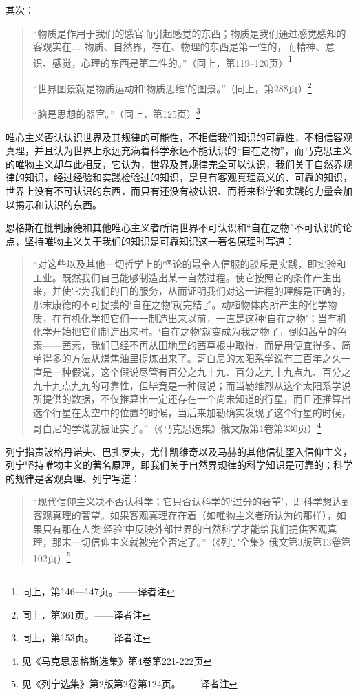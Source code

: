 其次：

\begin{quotation}
“物质是作用于我们的感官而引起感觉的东西；物质是我们通过感觉感知的客观实在……物质、自然界，存在、物理的东西是第一性的，而精神、意识、感觉，心理的东西是第二性的。”（同上，第119--120页）\footnote{同上，第146—147页。——译者注}

“世界图景就是物质运动和‘物质思维’的图景。”（同上，第288页）\footnote{同上，第361页。——译者注}

“脑是思想的器官。”（同上，第125页）\footnote{同上，第153页。——译者注}
\end{quotation}

唯心主义否认认识世界及其规律的可能性，不相信我们知识的可靠性，不相信客观真理，并且认为世界上永远充满着科学永远不能认识的“自在之物”，而马克思主义的唯物主义却与此相反，它认为，世界及其规律完全可以认识，我们关于自然界规律的知识，经过经验和实践检验过的知识，是具有客观真理意义的、可靠的知识，世界上没有不可认识的东西，而只有还没有被认识、而将来科学和实践的力量会加以揭示和认识的东西。

恩格斯在批判康德和其他唯心主义者所谓世界不可认识和“自在之物”不可认识的论点，坚持唯物主义关于我们的知识是可靠知识这一著名原理时写道：

\begin{quotation}
“对这些以及其他一切哲学上的怪论的最令人信服的驳斥是实践，即实验和工业。既然我们自己能够制造出某一自然过程。使它按照它的条件产生出来，并使它为我们的目的服务，从而证明我们对这一进程的理解是正确的，那末康德的不可捉摸的‘自在之物’就完结了。动植物体内所产生的化学物质，在有机化学把它们一一制造出来以前，一直是这种‘自在之物’；当有机化学开始把它们制造出来时。‘自在之物’就变成为我之物了，倒如茜草的色素——茜素，我们已经不再从田地里的茜草根中取得，而是用便宜得多、简单得多的方法从煤焦油里提炼出来了。哥白尼的太阳系学说有三百年之久一直是一种假说，这个假说尽管有百分之九十九、百分之九十九点九、百分之九十九点九九的可靠性，但毕竟是一种假说；而当勒维烈从这个太阳系学说所提供的数据，不仅推算出一定还存在一个尚未知道的行星，而且还推算出选个行星在太空中的位置的时候，当后来加勒确实发现了这个行星的时候，哥白尼的学说就被证实了。”（《马克思选集》俄文版第1卷第330页）\footnote{见《马克思恩格斯选集》第4卷第221-222页}
\end{quotation}

列宁指责波格丹诺夫、巴扎罗夫，尤什凯维奇以及马赫的其他信徒堕入信仰主义，列宁坚持唯物主义的著名原理，即我们关于自然界规律的科学知识是可靠的；科学的规律是客观真理、列宁写道：

\begin{quotation}
“现代信仰主义决不否认科学；它只否认科学的‘过分的奢望’，即科学想达到客观真理的奢望。如果客观真理存在着（如唯物主义者所认为的那样），如果只有那在人类‘经验’中反映外部世界的自然科学才能给我们提供客观真理，那末一切信仰主义就被完全否定了。”（《列宁全集》俄文第3版第13卷第102页）\footnote{见《列宁选集》第2版第2卷第124页。——译者注}
\end{quotation}

